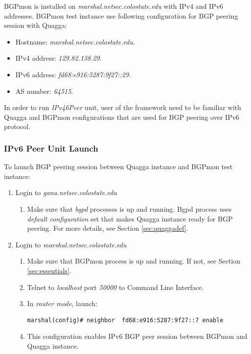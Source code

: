 BGPmon is installed on \emph{marshal.netsec.colostate.edu} with IPv4 and IPv6 addresses. BGPmon test instance use following configuration for BGP peering session with Quagga: 
\begin{itemize} 
  \item{Hostname: \emph{marshal.netsec.colostate.edu}.}
  \item{IPv4 address: \emph{129.82.138.29}.}
  \item{IPv6 address: \emph{fd68:e916:5287:9f27::29}.}
  \item{AS number: \emph{64515}.}
\end{itemize}

In order to run \emph{IPv46Peer} unit, user of the framework need to be familiar with Quagga and BGPmon configurations that are used for BGP peering over IPv6 protocol.

\subsubsection{IPv6 Peer Unit Launch}

To launch BGP peering session between Quagga instance and BGPmon test instance:




\begin{enumerate}
\item{Login to \emph{gana.netsec.colostate.edu}}
  \begin{enumerate}
    \item{Make sure that \emph{bgpd} processes is up and running. {Bgpd} process uses \emph{default configuration} set that makes Quagga instance ready for BGP peering. For more details, see Section \ref{sec:quaggadef}.}
  \end{enumerate}

\item{Login to \emph{marshal.netsec.colostate.edu}}
  \begin{enumerate}
  \item{Make sure that BGPmon process is up and running. If not, see Section \ref{sec:essentials}.}
  \item{Telnet to \emph{localhost} port \emph{50000} to Command Line Interface.}
  \item{In \emph{router mode}, launch:}
    \begin{verbatim}
marshal(config)# neighbor  fd68:e916:5287:9f27::7 enable
    \end{verbatim}
   \item{This configuration enables IPv6 BGP peer session between BGPmon and Quagga instance.} 
  \end{enumerate}
\end{enumerate}

